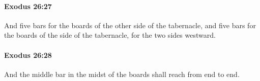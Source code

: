 		\paragraph{Exodus 26:27} %
			\label{EXODUS-26-27}

			And five bars for the boards of the other side of the tabernacle, and five bars for the boards of the side of the tabernacle, for the two sides westward.


		\paragraph{Exodus 26:28} %
			\label{EXODUS-26-28}

			And the middle bar in the midst of the boards shall reach from end to end.


